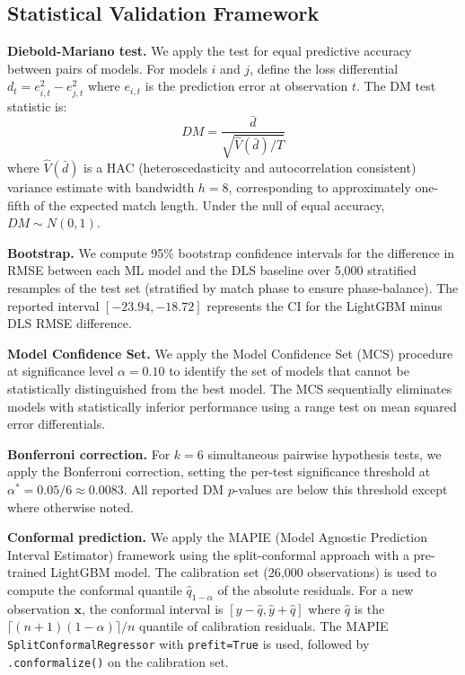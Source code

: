 \documentclass[10pt,a4paper,twocolumn]{article}
\begin{document}
\subsection{Statistical Validation Framework}

\textbf{Diebold-Mariano test.} We apply the \citet{Diebold1995} test for equal predictive accuracy between pairs of models. For models $i$ and $j$, define the loss differential $d_t = e_{i,t}^2 - e_{j,t}^2$ where $e_{i,t}$ is the prediction error at observation $t$. The DM test statistic is:
\begin{equation}
DM = \frac{\bar{d}}{\sqrt{\hat{V}(\bar{d})/T}}
\label{eq:dm}
\end{equation}
where $\hat{V}(\bar{d})$ is a HAC (heteroscedasticity and autocorrelation consistent) variance estimate with bandwidth $h = 8$, corresponding to approximately one-fifth of the expected match length. Under the null of equal accuracy, $DM \sim N(0,1)$.

\textbf{Bootstrap.} We compute 95\% bootstrap confidence intervals for the difference in RMSE between each ML model and the DLS baseline over 5,000 stratified resamples of the test set (stratified by match phase to ensure phase-balance). The reported interval $[-23.94, -18.72]$ represents the CI for the LightGBM minus DLS RMSE difference.

\textbf{Model Confidence Set.} We apply the \citet{Hansen2011} Model Confidence Set (MCS) procedure at significance level $\alpha = 0.10$ to identify the set of models that cannot be statistically distinguished from the best model. The MCS sequentially eliminates models with statistically inferior performance using a range test on mean squared error differentials.

\textbf{Bonferroni correction.} For $k = 6$ simultaneous pairwise hypothesis tests, we apply the Bonferroni correction, setting the per-test significance threshold at $\alpha^* = 0.05/6 \approx 0.0083$. All reported DM $p$-values are below this threshold except where otherwise noted.

\textbf{Conformal prediction.} We apply the MAPIE (Model Agnostic Prediction Interval Estimator) framework \citep{Vovk2005} using the split-conformal approach with a pre-trained LightGBM model. The calibration set (26,000 observations) is used to compute the conformal quantile $\hat{q}_{1-\alpha}$ of the absolute residuals. For a new observation $\mathbf{x}$, the conformal interval is $[\hat{y} - \hat{q}, \hat{y} + \hat{q}]$ where $\hat{q}$ is the $\lceil (n+1)(1-\alpha) \rceil / n$ quantile of calibration residuals. The MAPIE \texttt{SplitConformalRegressor} with \texttt{prefit=True} is used, followed by \texttt{.conformalize()} on the calibration set.
\end{document}
